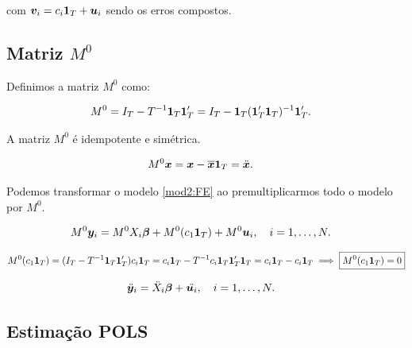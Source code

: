 \documentclass[11pt,oneside,a4paper]{article}
\numberwithin{equation}{section}
\begin{document}
\noindent
com
$\boldsymbol{v}_{i} = c_{i} \boldsymbol{1}_{T} + \boldsymbol{u}_{i}$ sendo os erros compostos.

\subsection*{Matriz $M^{0}$}

Definimos a matriz $M^{0}$ como:

\vspace{-1 em}
\begin{align*}
	M^{0} &=
	I_{T} - T^{-1} \boldsymbol{1}_{T} \boldsymbol{1}_{T}'
	=
	I_{T} - \boldsymbol{1}_{T} (\boldsymbol{1}_{T}' \boldsymbol{1}_{T})^{-1} \boldsymbol{1}_{T}'.
\end{align*}

\noindent
A matriz $M^{0}$ é idempotente e simétrica.

\begin{align*}
	M^{0} \boldsymbol{x} &= \boldsymbol{x} - \overline{\boldsymbol{x}} \boldsymbol{1}_{T}
	= \ddot{\boldsymbol{x}}.
\end{align*}

Podemos transformar o modelo \eqref{mod2:FE} ao premultiplicarmos todo o modelo por $M^{0}$.

\vspace{-1 em}
\begin{align*} 
M^{0} \boldsymbol{y}_{i} &= M^{0} X_{i} \boldsymbol{\beta} + M^{0} ( c_{1} \boldsymbol{1}_{T} ) + M^{0} \boldsymbol{u}_{i},
\quad i = 1, \dots, N.
\end{align*}

\vspace{-1 em}
\begin{align*} 
M^{0} ( c_{1} \boldsymbol{1}_{T} ) = 
( I_{T} - T^{-1} \boldsymbol{1}_{T} \boldsymbol{1}_{T}' ) c_{i} \boldsymbol{1}_{T} 
=
c_{i} \boldsymbol{1}_{T} - T^{-1} c_{i} \boldsymbol{1}_{T} \boldsymbol{1}_{T}' \boldsymbol{1}_{T} 
=
c_{i} \boldsymbol{1}_{T} - c_{i} \boldsymbol{1}_{T} 
\implies
\boxed{ M^{0} ( c_{1} \boldsymbol{1}_{T} ) = 0 }
\end{align*}

\vspace{-1 em}
\begin{align} \label{mod2:FE}
\ddot{\boldsymbol{y}}_{i} &= \ddot{X}_{i} \boldsymbol{\beta} + \ddot{\boldsymbol{u}_{i}},
\quad i = 1, \dots, N.
\end{align}

\subsection*{Estimação POLS}
\end{document}

